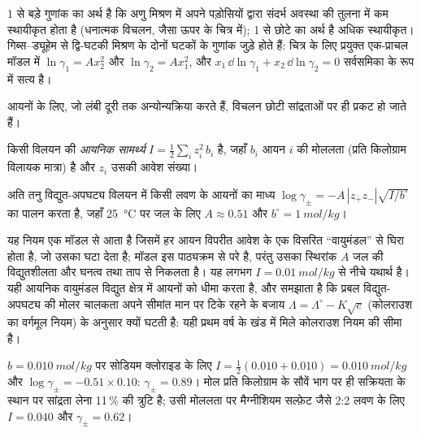 1 से बड़े गुणांक का अर्थ है कि अणु मिश्रण में अपने पड़ोसियों द्वारा संदर्भ
अवस्था की तुलना में कम स्थायीकृत होता है (धनात्मक विचलन, जैसा ऊपर के चित्र
में); 1 से छोटे का अर्थ है अधिक स्थायीकृत। गिब्स--ड्यूहेम से द्वि-घटकी मिश्रण के
दोनों घटकों के गुणांक जुड़े होते हैं: चित्र के लिए प्रयुक्त एक-प्राचल
मॉडल में $\ln\gamma_1 = Ax_2^2$ और $\ln\gamma_2 = Ax_1^2$, और
$x_1\,\dd\ln\gamma_1 + x_2\,\dd\ln\gamma_2 = 0$ सर्वसमिका के रूप में सत्य है।

आयनों के लिए, जो लंबी दूरी तक अन्योन्यक्रिया करते हैं, विचलन छोटी
सांद्रताओं पर ही प्रकट हो जाते हैं।

\begin{definition}[आयनिक सामर्थ्य]\label{def:b2:chemical-potential:ionic-strength}
किसी विलयन की \emph{आयनिक सामर्थ्य} $I =
\frac12\sum_i z_i^2\,b_i$ है, जहाँ $b_i$ आयन $i$ की मोललता (प्रति
किलोग्राम विलायक मात्रा) है और $z_i$ उसकी आवेश संख्या।
\end{definition}

\begin{proposition}[डिबाई--ह्युकेल सीमांत नियम]\label{prop:b2:chemical-potential:debye-huckel}
अति तनु विद्युत-अपघट्य विलयन में किसी लवण के आयनों का माध्य
 $\log\gamma_\pm = -A\,|z_+z_-|\sqrt{I/b^\circ}$ का पालन करता है, जहाँ
\qty{25}{\celsius} पर जल के लिए $A
\approx 0.51$ और $b^\circ =
\qty{1}{mol/kg}$।
\end{proposition}
\admitted

\begin{remark}[परिसर और उद्गम]\label{rem:b2:chemical-potential:dh-range}
यह नियम एक मॉडल से आता है जिसमें हर आयन विपरीत आवेश के एक विसरित
``वायुमंडल'' से घिरा होता है, जो उसका  घटा देता है;
मॉडल इस पाठ्यक्रम से परे है, परंतु उसका स्थिरांक $A$ जल की
विद्युतशीलता और घनत्व तथा ताप से निकलता है। यह लगभग
$I = \qty{0.01}{mol/kg}$ से नीचे यथार्थ है। यही आयनिक वायुमंडल विद्युत क्षेत्र में
आयनों को धीमा करता है, और समझाता है कि प्रबल विद्युत-अपघट्य की मोलर चालकता
अपने सीमांत मान पर टिके रहने के बजाय $\Lambda = \Lambda^\circ - K\sqrt c$
(कोलराउश का वर्गमूल नियम) के अनुसार क्यों घटती है: यही प्रथम वर्ष के
खंड में मिले कोलराउश नियम की सीमा है।
\end{remark}

\begin{example}[एक सेंटीमोलर लवण]\label{ex:b2:chemical-potential:dh}
$b = \qty{0.010}{mol/kg}$ पर सोडियम क्लोराइड के लिए $I = \frac12(0.010 + 0.010)
= \qty{0.010}{mol/kg}$ और $\log\gamma_\pm = -0.51 \times 0.10$: $\gamma_\pm
= 0.89$। मोल प्रति किलोग्राम के सौवें भाग पर ही सक्रियता के स्थान पर
सांद्रता लेना 11\,\% की त्रुटि है; उसी मोललता पर मैग्नीशियम सल्फ़ेट जैसे
2:2 लवण के लिए $I = 0.040$ और $\gamma_\pm = 0.62$।
\end{example}

